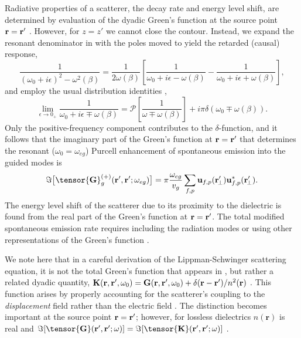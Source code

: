 \documentclass[preprint,aps,pra,onecolumn]{revtex4-1} %
\begin{document}
Radiative properties of a scatterer, the decay rate and energy level shift, are determined by evaluation of the dyadic Green's function at the source point $\mathbf{r} = \mathbf{r}'$ \cite{fussell_decay_2005}.  However, for $z=z'$ we cannot close the contour. Instead, we expand the resonant denominator in  with the poles moved to yield the retarded (causal) response,
\begin{equation}
\frac{1}{(\omega_0+i\epsilon)^2-\omega^2(\beta)}=\frac{1}{2 \omega(\beta)}\left[ \frac{1}{\omega_0+ i 
\epsilon - \omega(\beta)} - \frac{1}{\omega_0+ i \epsilon + \omega(\beta)} \right],
\end{equation}
 and employ the usual distribution identities \cite{sondergaard_general_2001},
\begin{equation}
\lim_{\epsilon \rightarrow 0_+} \frac{1}{\omega_0 + i \epsilon \mp 
\omega(\beta)}=\mathcal{P}\left[\frac{1}{\omega \mp \omega(\beta)} \right] + i \pi \delta (\omega_0 \mp 
\omega(\beta)).
\end{equation}
Only the positive-frequency component contributes to the $\delta$-function, and it follows that the imaginary part of the Green's function at $\mathbf{r} = \mathbf{r}'$ that determines the resonant ($\omega_0 = \omega_{eg}$) Purcell enhancement of spontaneous emission into the guided modes is \cite{dung_spontaneous_2000, fussell_decay_2005, chen_finite-element_2010}
	\begin{equation}\label{Eq::ImGreenLocal}
		\Im \big[\tensor{\mathbf{G}}^{(+)}_g(\br',\br'; \omega_{eg}) \big] = \pi \frac{\omega_{eg}}{v_g } \sum_{f, p} 
		\mathbf{u}_{f, p} (\br_{\!\perp}^\prime)\mathbf{u}^*_{f , p} (\br_{\!\perp}^\prime).
	\end{equation}
The energy level shift of the scatterer due to its proximity to the dielectric is found from the real part of the Green's function at $\mathbf{r} = \mathbf{r}'$. The total modified spontaneous emission rate requires including the radiation modes \cite{le_kien_spontaneous_2005} or using other representations of the Green's function \cite{klimov_spontaneous_2004}.  

We note here that in a careful derivation of the Lippman-Schwinger scattering equation, it is not the total Green's function that appears in , but rather a related dyadic quantity, $\mathbf{K}(\mathbf{r},\mathbf{r}', \omega_0) = \mathbf{G}(\mathbf{r},\mathbf{r}', \omega_0) + \delta(\mathbf{r}-\mathbf{r}')/n^2(\mathbf{r})$ \cite{wubs_multiple-scattering_2004}. This function arises by properly accounting for the scatterer's coupling to the \emph{displacement} field rather than the electric field \cite{yao_ultrahigh_2009}.  The distinction becomes important at the source point $\mathbf{r} = \mathbf{r}'$; however, for lossless dielectrics $n(\mathbf{r})$ is real and $\Im[\tensor{\mathbf{G}}(\br',\br'; \omega)] = \Im[\tensor{\mathbf{K}}(\br',\br'; \omega)]$ \cite{yao_-chip_2010}. 
\end{document}
